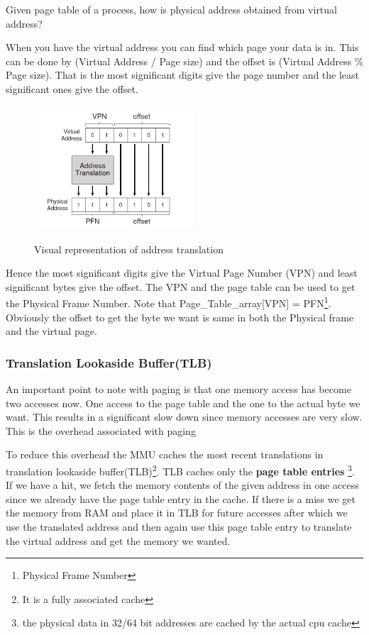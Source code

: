 \documentclass[12pt]{article}
\begin{document}
Given page table of a process, how is physical address obtained from virtual address?

When you have the virtual address you can find which page your data is in. This can be done by (Virtual Address / Page size) and the offset is (Virtual Address \% Page size).
That is the most significant digits give the page number and the least significant ones give the offset. 

\begin{figure}
    \begin{center}
        \includegraphics[width = 6cm]{address_translation.png}
        \label{figure:address_translation}
        \caption{Visual representation of address translation}
    \end{center}
\end{figure}


Hence the most significant digits give the Virtual Page Number (VPN) and least significant bytes give the offset. The VPN and the page
table can be used to get the Physical Frame Number. Note that Page\_Table\_array[VPN] = PFN\footnote{Physical Frame Number}. Obviously the offset to get the byte
we want is same in both the Physical frame and the virtual page.

\subsubsection*{Translation Lookaside Buffer(TLB)}
An important point to note with paging is that one memory access has become two accesses now. One access to the page table and the one to the actual byte we want. This results in a significant
slow down since memory accesses are very slow. This is the overhead associated with paging

To reduce this overhead the MMU caches the most recent translations in translation lookaside buffer(TLB)\footnote{It is a fully associated cache}.
TLB caches only the \textbf{page table entries} \footnote{the physical data in 32/64 bit addresses are cached by the actual cpu cache}. If we have
a hit, we fetch the memory contents of the given address in one access since we already have the page table entry in the cache. If there is a miss we get the memory from RAM and place it in TLB for future accesses after 
which we use the translated address and then again use this page table entry to translate the virtual address and get the memory we wanted.
\end{document}
